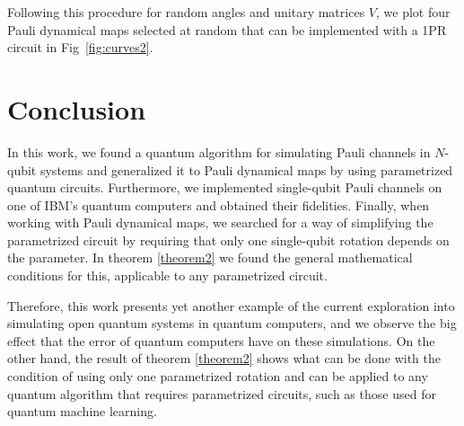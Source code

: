 \documentclass[10pt,letterpaper]{article} %
\newcommand{\fref}[1]{Fig~\ref{#1}}
\begin{document}
Following this procedure for random
angles and unitary matrices $V$, 
we plot four Pauli dynamical maps  selected at random
that can be implemented with a 1PR circuit in \fref{fig:curves2}.

\section{Conclusion} %

In this work, we found a quantum algorithm for 
simulating Pauli channels in $N$-qubit systems and
generalized it to Pauli dynamical maps
by using parametrized quantum circuits.
Furthermore, we implemented single-qubit Pauli channels
on one of IBM's quantum computers
and obtained their fidelities. 
Finally, when working with Pauli dynamical maps,
we searched for a way of simplifying the parametrized circuit
by requiring that only one single-qubit rotation depends on the parameter.
In theorem \ref{theorem2} we found the general mathematical conditions for 
this, applicable to any parametrized circuit.

Therefore, this work presents yet another example of the current
exploration into simulating open quantum
systems in quantum computers,
and we observe the big effect that the error of quantum computers have
on these simulations.
On the other hand, the result
of theorem \ref{theorem2}
shows what can be done with the condition of using only one
parametrized rotation and
can be applied to any quantum algorithm that requires parametrized circuits,
such as those used for quantum machine learning.

\end{document}
